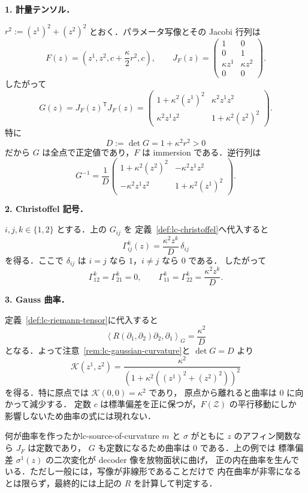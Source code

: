 \textbf{1. 計量テンソル．}

$r^2:=(z^1)^2+(z^2)^2$ とおく．パラメータ写像とその Jacobi 行列は
\[
  F(z)=\left(z^1,z^2,c+\frac{\kappa}{2}r^2,c\right),
  \qquad
  J_F(z)=
  \begin{pmatrix}
    1&0\\
    0&1\\
    \kappa z^1&\kappa z^2\\
    0&0
  \end{pmatrix}.
\]
したがって
\[
  G(z)=J_F(z)^{\mathsf T}J_F(z)
  =\begin{pmatrix}
    1+\kappa^2(z^1)^2&\kappa^2z^1z^2\\
    \kappa^2z^1z^2&1+\kappa^2(z^2)^2
  \end{pmatrix}.
\]
特に
\[
  D:=\det G=1+\kappa^2r^2>0
\]
だから $G$ は全点で正定値であり，$F$ は immersion である．逆行列は
\[
  G^{-1}
  =\frac1D
  \begin{pmatrix}
    1+\kappa^2(z^2)^2&-\kappa^2z^1z^2\\
    -\kappa^2z^1z^2&1+\kappa^2(z^1)^2
  \end{pmatrix}.
\]

\textbf{2. Christoffel 記号．}

$i,j,k\in\{1,2\}$ とする．上の $G_{ij}$ を
定義~\ref{def:lc-christoffel}へ代入すると
\[
  \boxed{
    \Gamma^k_{ij}(z)
    =\frac{\kappa^2z^k}{D}\,\delta_{ij}
  }
\]
を得る．ここで $\delta_{ij}$ は $i=j$ なら $1$，$i\neq j$ なら $0$ である．
したがって
\[
  \Gamma^k_{12}=\Gamma^k_{21}=0,
  \qquad
  \Gamma^k_{11}=\Gamma^k_{22}=\frac{\kappa^2z^k}{D}.
\]

\textbf{3. Gauss 曲率．}

定義~\ref{def:lc-riemann-tensor}に代入すると
\[
  \left\langle
    R(\partial_1,\partial_2)\partial_2,
    \partial_1
  \right\rangle_G
  =\frac{\kappa^2}{D}
\]
となる．よって注意~\ref{rem:lc-gaussian-curvature}と $\det G=D$ より
\[
  \boxed{
    \mathcal{K}(z^1,z^2)
    =\frac{\kappa^2}
      {\left(1+\kappa^2((z^1)^2+(z^2)^2)\right)^2}
  }
\]
を得る．特に原点では $\mathcal{K}(0,0)=\kappa^2$ であり，
原点から離れると曲率は $0$ に向かって減少する．
定数 $c$ は標準偏差を正に保つが，$F(\mathcal{Z})$ の平行移動にしか
影響しないため曲率の式には現れない．

\begin{remark}{何が曲率を作ったか}{lc-source-of-curvature}
  $m$ と $\sigma$ がともに $z$ のアフィン関数なら $J_F$ は定数であり，
  $G$ も定数になるため曲率は $0$ である．上の例では
  標準偏差 $\sigma^1(z)$ の二次変化が decoder 像を放物面状に曲げ，
  正の内在曲率を生んでいる．ただし一般には，写像が非線形であることだけで
  内在曲率が非零になるとは限らず，最終的には上記の $R$ を計算して判定する．
\end{remark}


